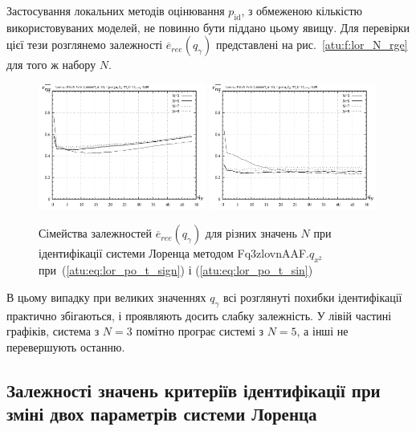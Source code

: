 Застосування локальних методів оцінювання
$ p_\mathrm{id} $, з обмеженою кількістю використовуваних моделей,
не повинно бути піддано цьому явищу. Для перевірки цієї тези
розглянемо залежності
$ \overline{e}_{ree} (q_\gamma) $ представлені на рис.~\ref{atu:f:lor_N_rge} для того
ж набору $ N $.

\begin{figure}[ht!]
  \centerline{
    \includegraphics[width=0.49\textwidth]{p/cha/lor/Fq3zlovnAAF/N/lor_Fq3zlovnAAF_qx2_p_qg_e_ree_sign.png}
    \hfill
    \includegraphics[width=0.49\textwidth]{p/cha/lor/Fq3zlovnAAF/N/lor_Fq3zlovnAAF_qx2_p_qg_e_ree_sin.png}
  }
\caption{Сімейства залежностей $ \overline{e}_{ree} (q_\gamma) $ для різних значень
$ N $ при ідентифікації системи Лоренца методом Fq3zlovnAAF.$q_{x^2} $ при~(\ref{atu:eq:lor_po_t_sign}) і (\ref{atu:eq:lor_po_t_sin})}
\label{atu:f:lor_N_ree}
\end{figure}

В цьому випадку при великих значеннях
$ q_\gamma $ всі розглянуті похибки ідентифікації практично
збігаються, і проявляють досить слабку залежність. У лівій
частині графіків, система з
$ N = 3 $ помітно програє системі з
$ N = 5 $, а інші не перевершують останню.




\subsection{Залежності значень критеріїв ідентифікації при зміні двох параметрів системи Лоренца} %

